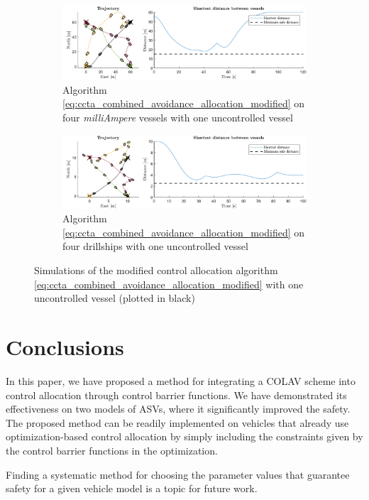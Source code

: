 \begin{figure}[t]
    \centering
    \begin{subfigure}{0.8\linewidth}
        \centering
        \includegraphics[width = \textwidth]{figures/ccta/milliAmpere_modified_uncontrolled.pdf}
        \caption{Algorithm \eqref{eq:ccta_combined_avoidance_allocation_modified} on four \emph{milliAmpere} vessels with one uncontrolled vessel}
        \vspace{0em}
    \end{subfigure}
    \begin{subfigure}{0.8\linewidth}
        \centering
        \includegraphics[width = \textwidth]{figures/ccta/drillship_modified_uncontrolled.pdf}
        \caption{Algorithm \eqref{eq:ccta_combined_avoidance_allocation_modified} on four drillships with one uncontrolled vessel}
        \label{fig:ccta_drillship_unc}
        \vspace{-1.5mm}
    \end{subfigure}
    \caption{Simulations of the modified control allocation algorithm \eqref{eq:ccta_combined_avoidance_allocation_modified} with one uncontrolled vessel (plotted in black)}
    \label{fig:ccta_uncontrolled}
    \vspace{-6mm}
\end{figure}

\section{Conclusions}
\label{sec:ccta_conclusion}
In this paper, we have proposed a method for integrating a COLAV scheme into control allocation through control barrier functions.
We have demonstrated its effectiveness on two models of ASVs, where it significantly improved the safety.
The proposed method can be readily implemented on vehicles that already use optimization-based control allocation by simply including the constraints given by the control barrier functions in the optimization.

Finding a systematic method for choosing the parameter values that guarantee safety for a given vehicle model is a topic for future work.
